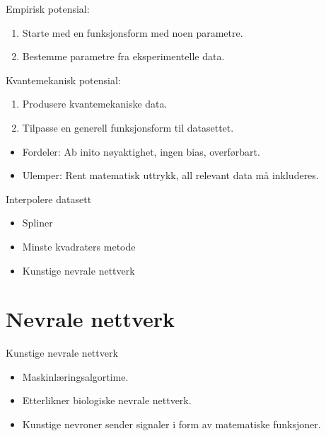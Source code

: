 \documentclass{beamer}
\begin{document}
\begin{frame}

\begin{block}{Empirisk potensial:}
 \begin{enumerate}
  \item Starte med en funksjonsform med noen parametre.
  \item Bestemme parametre fra eksperimentelle data.
 \end{enumerate}
\end{block}

\begin{block}{Kvantemekanisk potensial:}
 \begin{enumerate}
  \item Produsere kvantemekaniske data. 
  \item Tilpasse en generell funksjonsform til datasettet.
 \end{enumerate}
 
 \begin{itemize}
  \item Fordeler: Ab inito nøyaktighet, ingen bias, overførbart.
  \item Ulemper: Rent matematisk uttrykk, all relevant data må inkluderes. 
 \end{itemize}
\end{block}

\end{frame}


\begin{frame}
 
\begin{block}{Interpolere datasett}
 \begin{itemize}
  \item Spliner
  \item Minste kvadraters metode
  \item Kunstige nevrale nettverk
 \end{itemize}
\end{block}
 
\end{frame}


\section{Nevrale nettverk}


\begin{frame}

\begin{block}{Kunstige nevrale nettverk}
 \begin{itemize}
  \item Maskinlæringsalgortime.  
  \item Etterlikner biologiske nevrale nettverk.
  \item Kunstige nevroner sender signaler i form av matematiske funksjoner. 
 \end{itemize}
\end{block}

\end{frame}
\end{document}
